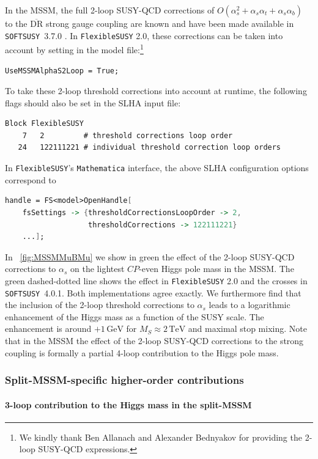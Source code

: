 \documentclass[final,3p,11pt,pdflatex]{elsarticle}
\makeatletter
\newcommand{\fs}{\texttt{FlexibleSUSY}\@\xspace}
\newcommand{\softsusy}{\texttt{SOFTSUSY}\@\xspace}
\newcommand{\fstwo}{\fs 2.0\@\xspace}
\newcommand{\mathematica}{\texttt{Ma\-the\-ma\-ti\-ca}\xspace}
\newcommand{\ol}[1]{\overline{#1}}
\newcommand{\DRbar}{\ensuremath{\ol{\text{DR}}}\xspace}
\newcommand{\unit}[1]{\,\text{#1}}      %
\newcommand{\MS}{\ensuremath{M_S}\xspace}
\newcommand{\figref}[1]{\figurename~\ref{#1}}
\newcommand{\CP}{\ensuremath{CP}\xspace}
\newcommand{\SQCD}{SUSY-QCD\xspace}
\def\at{\alpha_t}
\def\ab{\alpha_b}
\def\as{\alpha_s}
\makeatother
\begin{document}
In the MSSM, the full 2-loop \SQCD corrections of
$O(\as^2 + \as\at + \as\ab)$ to the \DRbar strong gauge coupling are known
\cite{Harlander:2005wm,Bauer:2008bj,Bednyakov:2010ni} and have been
made available in \softsusy~3.7.0 \cite{Allanach:2014nba}.  In \fstwo,
these corrections can be taken into account by setting in the model
file:\footnote{We kindly thank Ben Allanach and Alexander Bednyakov
  for providing the 2-loop \SQCD expressions.}
%
\begin{lstlisting}
UseMSSMAlphaS2Loop = True;
\end{lstlisting}
%
To take these 2-loop threshold corrections into account at runtime, the
following flags should also be set in the SLHA input file:
%
\begin{lstlisting}
Block FlexibleSUSY
    7   2         # threshold corrections loop order
   24   122111221 # individual threshold correction loop orders
\end{lstlisting}
%
In \fs's \mathematica interface, the above SLHA configuration options
correspond to
%
\begin{lstlisting}[language=Mathematica]
handle = FS<model>OpenHandle[
    fsSettings -> {thresholdCorrectionsLoopOrder -> 2,
                   thresholdCorrections -> 122111221}
    ...];
\end{lstlisting}
%
In \figref{fig:MSSMMuBMu} we show in green the effect of the 2-loop
\SQCD corrections to $\as$ on the lightest \CP-even Higgs pole
mass in the MSSM\@.  The green dashed-dotted line shows the effect in
\fstwo and the crosses in \softsusy~4.0.1.  Both implementations agree
exactly.  We furthermore find that the inclusion of the 2-loop
threshold corrections to $\as$ leads to a logarithmic enhancement
of the Higgs mass as a function of the SUSY scale.  The enhancement is
around $+1\unit{GeV}$ for $\MS\approx 2\unit{TeV}$ and maximal stop
mixing.
%
Note that in the MSSM the effect of the 2-loop \SQCD corrections to
the strong coupling is formally a partial 4-loop contribution to the
Higgs pole mass.

\subsubsection{Split-MSSM-specific higher-order contributions}
\paragraph{3-loop contribution to the Higgs mass in the split-MSSM}
\end{document}
